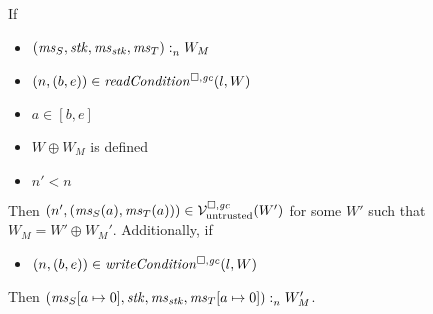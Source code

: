 \begin{lemma}
  \label{lem:readcond-writecond-work}
  If
  \begin{itemize}
  \item $\memSat{(\ms_S,\stk,\ms_\stk,\ms_T)}{W_M}$
  \item $\npair{(b,e)}\in\readCond{l,W}$
  \item $a \in [b,e]$
  \item $W \oplus W_M$ is defined
  \item $n' < n$
  \end{itemize}
  Then $\npair[n']{(\ms_S(a),\ms_T(a))} \in \lrv(W')$ for some $W'$ such that $W_M = W' \oplus W_M'$.
  Additionally, if
  \begin{itemize}
  \item $\npair{(b,e)}\in\writeCond{l,W}$
  \end{itemize}
  Then $\memSat{(\ms_S[a\mapsto 0],\stk,\ms_\stk,\ms_T[a\mapsto 0])}{W_M'}$.
\end{lemma}
